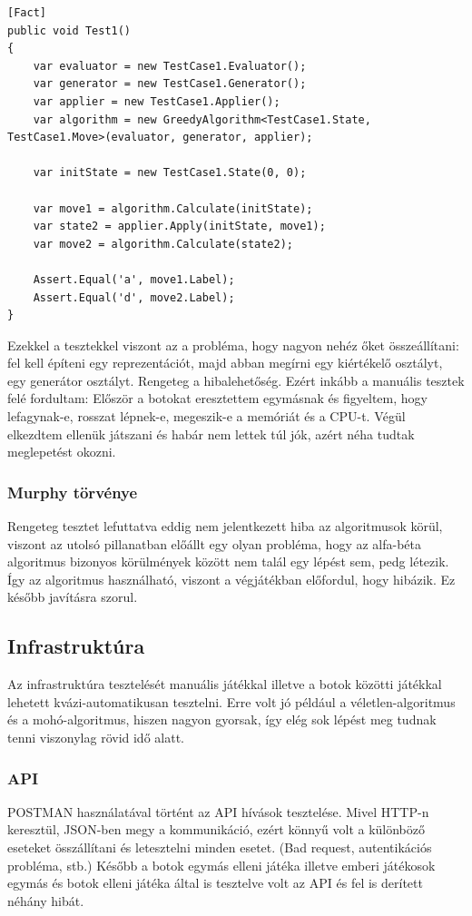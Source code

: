 \documentclass[twoside, a4paper, 12pt]{article}
\begin{document}
\begin{lstlisting}[caption=Mohó-algoritmus teszt, label=lst:greedy_test, float]
[Fact]
public void Test1()
{
	var evaluator = new TestCase1.Evaluator();
	var generator = new TestCase1.Generator();
	var applier = new TestCase1.Applier();
	var algorithm = new GreedyAlgorithm<TestCase1.State, TestCase1.Move>(evaluator, generator, applier);
	
	var initState = new TestCase1.State(0, 0);
	
	var move1 = algorithm.Calculate(initState);
	var state2 = applier.Apply(initState, move1);
	var move2 = algorithm.Calculate(state2);
	
	Assert.Equal('a', move1.Label);
	Assert.Equal('d', move2.Label);
}
\end{lstlisting}

Ezekkel a tesztekkel viszont az a probléma, hogy nagyon nehéz őket összeállítani: fel kell építeni egy reprezentációt, majd abban megírni egy kiértékelő osztályt, egy generátor osztályt. Rengeteg a hibalehetőség. Ezért inkább a manuális tesztek felé fordultam:
Először a botokat eresztettem egymásnak és figyeltem, hogy lefagynak-e, rosszat lépnek-e, megeszik-e a memóriát és a CPU-t. Végül elkezdtem ellenük játszani és habár nem lettek túl jók, azért néha tudtak meglepetést okozni.

\subsubsection{Murphy törvénye}
Rengeteg tesztet lefuttatva eddig nem jelentkezett hiba az algoritmusok körül, viszont az utolsó pillanatban előállt egy olyan probléma, hogy az alfa-béta algoritmus bizonyos körülmények között nem talál egy lépést sem, pedg létezik. Így az algoritmus használható, viszont a végjátékban előfordul, hogy hibázik. Ez később javításra szorul.


\subsection{Infrastruktúra}
Az infrastruktúra tesztelését manuális játékkal illetve a botok közötti játékkal lehetett kvázi-automatikusan tesztelni. Erre volt jó például a véletlen-algoritmus és a mohó-algoritmus, hiszen nagyon gyorsak, így elég sok lépést meg tudnak tenni viszonylag rövid idő alatt.


\subsubsection{API}
POSTMAN használatával történt az API hívások tesztelése. Mivel HTTP-n keresztül, JSON-ben megy a kommunikáció, ezért könnyű volt a különböző eseteket összállítani és letesztelni minden esetet. (Bad request, autentikációs probléma, stb.) Később a botok egymás elleni játéka illetve emberi játékosok egymás és botok elleni játéka által is tesztelve volt az API és fel is derített néhány hibát.
\end{document}
